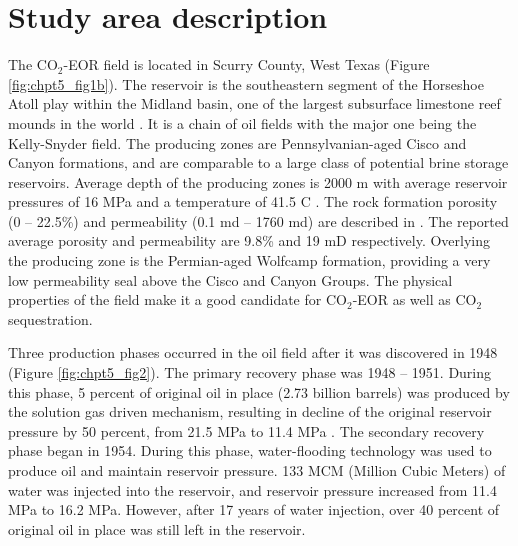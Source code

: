 \section{Study area description}
The CO$_{2}$-EOR field is located in Scurry County, West Texas (Figure \ref{fig:chpt5_fig1b}).  The reservoir is the southeastern segment of the Horseshoe Atoll play within the Midland basin, one of the largest subsurface limestone reef mounds in the world \cite[]{galloway1983atlas}.  It is a chain of oil fields with the major one being the Kelly-Snyder field.  The producing zones are Pennsylvanian-aged Cisco and Canyon formations, and are comparable to a large class of potential brine storage reservoirs.  Average depth of the producing zones is 2000 m \cite[]{vest1970oil,raines2001review} with average reservoir pressures of 16 MPa and a temperature of 41.5 \textordmasculine C \cite[]{raines66}.  The rock formation porosity (0 – 22.5\%) and permeability (0.1 md – 1760 md) are described in \citet{raines66}.  The reported average porosity and permeability are 9.8\% and 19 mD respectively.  Overlying the producing zone is the Permian-aged Wolfcamp formation, providing a very low permeability seal above the Cisco and Canyon Groups.  The physical properties of the field make it a good candidate for CO$_{2}$-EOR as well as CO$_{2}$ sequestration.

Three production phases occurred in the oil field after it was discovered in 1948 (Figure \ref{fig:chpt5_fig2}).  The primary recovery phase was 1948 – 1951.  During this phase, 5 percent of original oil in place (2.73 billion barrels) was produced by the solution gas driven mechanism, resulting in decline of the original reservoir pressure by 50 percent, from 21.5 MPa to 11.4 MPa \cite[]{dicharry1973evaluation,brummett1976reservoir}.  The secondary recovery phase began in 1954.  During this phase, water-flooding technology was used to produce oil and maintain reservoir pressure.  133 MCM (Million Cubic Meters) of water was injected into the reservoir, and reservoir pressure increased from 11.4 MPa to 16.2 MPa. However, after 17 years of water injection, over 40 percent of original oil in place was still left in the reservoir.

